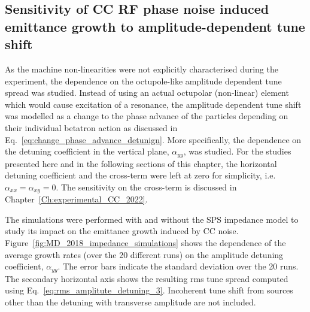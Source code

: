 \subsection{Sensitivity of CC RF phase noise induced emittance growth to amplitude-dependent tune shift}\label{subsec:amplitude_detuning_scan}

As the machine non-linearities were not explicitly characterised during the experiment, the dependence on the octupole-like amplitude dependent tune spread was studied. Instead of using an actual octupolar (non-linear) element which would cause excitation of a resonance, %
the amplitude dependent tune shift was modelled as a change to the phase advance of the particles depending on their individual betatron action as discussed in Eq.~\eqref{eq:change_phase_advance_detunign}. More specifically, the dependence on the detuning coefficient in the vertical plane, $\alpha_{yy}$, was studied. %
For the studies presented here and in the following sections of this chapter, the horizontal detuning coefficient and the cross-term were left at zero for simplicity, i.e.~$\alpha_{xx} = \alpha_{xy} = 0$. %
The sensitivity on the cross-term is discussed in Chapter~\ref{Ch:experimental_CC_2022}.

The simulations were performed with and without the SPS impedance model to study its impact on the emittance growth induced by CC noise. Figure~\ref{fig:MD_2018_impedance_simulations} shows the dependence of the average growth rates (over the 20 different runs) on the amplitude detuning coefficient, $\alpha_{yy}$. The error bars indicate the standard deviation over the 20 runs. The secondary horizontal axis shows the resulting rms tune spread computed using Eq.~\eqref{eq:rms_amplitute_detuning_3}. Incoherent tune shift from sources other than the detuning with transverse amplitude are not included. %

